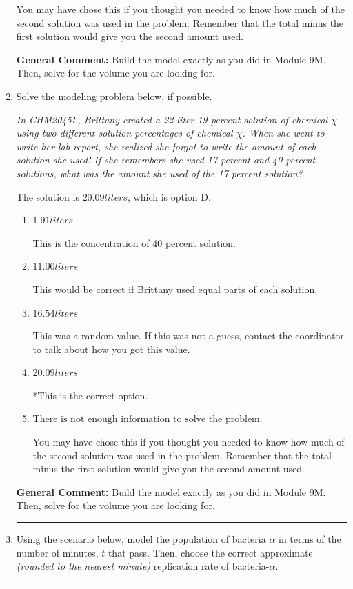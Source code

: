\documentclass{extbook}[14pt]
\newcommand{\litem}[1]{\item #1

\rule{\textwidth}{0.4pt}}
\begin{document}
\begin{enumerate}
{\begin{enumerate}[label=\Alph*.]
You may have chose this if you thought you needed to know how much of the second solution was used in the problem. Remember that the total minus the first solution would give you the second amount used.
\end{enumerate}

\textbf{General Comment:} Build the model exactly as you did in Module 9M. Then, solve for the volume you are looking for.
}
\litem{
Solve the modeling problem below, if possible.

\begin{center}
    \textit{ In CHM2045L, Brittany created a 22 liter 19 percent solution of chemical $\chi$ using two different solution percentages of chemical $\chi$. When she went to write her lab report, she realized she forgot to write the amount of each solution she used! If she remembers she used 17 percent and 40 percent solutions, what was the amount she used of the 17 percent solution? }
\end{center}
The solution is \( 20.09 liters \), which is option D.\begin{enumerate}[label=\Alph*.]
\item \( 1.91 liters \)

This is the concentration of 40 percent solution.
\item \( 11.00 liters \)

This would be correct if Brittany used equal parts of each solution.
\item \( 16.54 liters \)

This was a random value. If this was not a guess, contact the coordinator to talk about how you got this value.
\item \( 20.09 liters \)

*This is the correct option.
\item \( \text{There is not enough information to solve the problem.} \)

You may have chose this if you thought you needed to know how much of the second solution was used in the problem. Remember that the total minus the first solution would give you the second amount used.
\end{enumerate}

\textbf{General Comment:} Build the model exactly as you did in Module 9M. Then, solve for the volume you are looking for.
}
\litem{
Using the scenario below, model the population of bacteria $\alpha$ in terms of the number of minutes, $t$ that pass. Then, choose the correct approximate \textit{(rounded to the nearest minute)} replication rate of bacteria-$\alpha$.

}
\end{enumerate}
\end{document}
